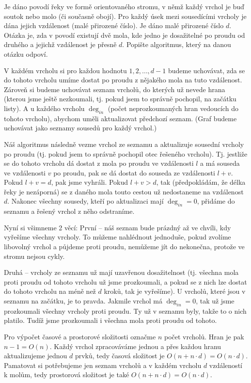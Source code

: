 \documentclass[12pt]{article}                   %
\begin{document}
    \begin{priklad}[řeka]
        Je dáno povodí řeky ve formě orientovaného stromu, v němž každý vrchol je buď soutok nebo molo (či současně obojí). Pro každý úsek mezi sousedícími vrcholy je dána jejich vzdálenost (malé přirozené číslo). Je dáno malé přirozené číslo $d$. Otázka je, zda v povodí existují dvě mola, kde jedno je dosažitelné po proudu od druhého a jejichž vzdálenost je přesně $d$. Popište algoritmus, který na danou otázku odpoví. 

        \begin{reseni}
            V každém vrcholu si pro každou hodnotu $1, 2, …, d - 1$ budeme uchovávat, zda se do tohoto vrcholu umíme dostat po proudu z nějakého mola na tuto vzdálenost. Zároveň si budeme uchovávat seznam vrcholů, do kterých už nevede hrana (kterou jsme ještě nezkoumali, tj. pokud jsem to správně pochopil, na začátku listy). A u každého vrcholu $\deg_{in}$ (počet neprozkoumaných hran vedoucích do tohoto vrcholu), abychom uměli aktualizovat předchozí seznam. (Graf budeme uchovávat jako seznamy sousedů pro každý vrchol.)

            Náš algoritmus následně vezme vrchol ze seznamu a aktualizuje sousední vrcholy po proudu (tj. pokud jsem to správně pochopil otec řešeného vrcholu). Tj. jestliže se do tohoto vrcholu dá dostat z mola po proudu ve vzdálenosti $l$ a má souseda ve vzdálenosti $v$ po proudu, pak se dá dostat do souseda ze vzdálenosti $l+v$. Pokud $l+v = d$, pak jsme vyhráli. Pokud $l+v>d$, tak (předpokládám, že délka řeky je nezáporná) se z daného mola touto cestou už nedostaneme na vzdálenost $d$. Nakonec všechny sousedy, kteří po aktualizaci mají $\deg_{in} = 0$, přidáme do seznamu a řešený vrchol z něho odstraníme.

            Nyní si všimneme 2 věcí: První -- náš seznam bude prázdný až ve chvíli, kdy vyřešíme všechny vrcholy. To můžeme nahlédnout jednoduše, pokud zvolíme libovolný vrchol a půjdeme proti proudu, nemůžeme jít do nekonečna, protože ve stromu nejsou cykly.

            Druhá -- vrcholy ze seznamu už mají uzavřenou dosažitelnost (tj. všechna mola proti proudu od tohoto vrcholu už jsme prozkoumali, a pokud se z nich lze dostat do tohoto vrcholu na méně než $d$ kroků, tak je vyřešíme). U vrcholů, které jsou v seznamu na začátku, je to pravda. Jakmile vrchol má $\deg_{in} = 0$, tak už jsme prozkoumali všechny vrcholy proti proudu. Ty už v seznamu byly, takže to o nich platilo. Tudíž jsme prozkoumali i všechna mola proti proudu od tohoto.

            Pro výpočet časové a prostorové složitosti označme $n$ počet vrcholů. Hran je pak $n-1 = O(n)$. Každý vrchol zpracováváme jednou a přes každou hranu aktualizujeme jednou $d$ prvků, tedy časová složitost je $O(n + n·d) = O(n·d)$. Pamatovat si potřebujeme jen seznam vrcholů a v každém vrcholu $d$ vzdáleností k molům, tedy prostorová složitost je také $O(n + n·d) = O(n·d)$.
        \end{reseni}
    \end{priklad}
\end{document}
